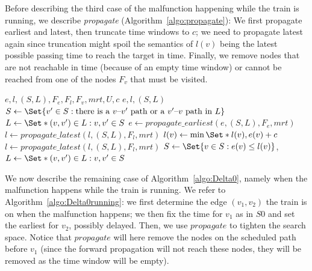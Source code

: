 \documentclass{article}
\begin{document}
Before describing the third case of the malfunction happening while the train is running, we describe \emph{propagate} (Algorithm~\ref{algo:propagate}): We first propagate earliest and latest, then truncate time windows to $c$; we need to propagate latest again since truncation might spoil the semantics of $l(v)$ being the latest possible passing time to reach the target in time. Finally, we remove nodes that are not reachable in time (because of an empty time window) or cannot be reached from one of the nodes $F_v$ that must be visited.

\begin{algorithm}
	\caption{$propagate$} \label{algo:propagate}
	\begin{algorithmic}[1]
	    \Require $e,l,(S,L),F_e,F_l,F_v,mrt,U,c$
	    \Ensure $e,l,(S,L)$
		    \State $S \leftarrow \Set{v^\prime \in S: \textrm{there is a }v\textrm{--}v^\prime\textrm{ path or a }v^\prime\textrm{--}v\textrm{ path in }L}$
		    \State $L \leftarrow \Set*{(v,v^\prime) \in L: v,v^\prime \in S}$
		\EndFor
	    \State $e \leftarrow propagate\_earliest(e, (S,L), F_e, mrt)$
		\State $l \leftarrow propagate\_latest(l,(S,L),F_l, mrt)$
	        \State $l(v) \leftarrow \min \Set*{l(v), e(v)+c}$
	    \EndFor
	    \State $l \leftarrow propagate\_latest(l,(S,L),F_l, mrt)$
	    \EndIf
		\State $S \leftarrow \Set{v \in S: e(v) \leq l(v)}$, $L \leftarrow \Set*{(v,v^\prime) \in L: v,v^\prime \in S}$

	\end{algorithmic}
\end{algorithm}



We now describe the remaining case of Algorithm~\ref{algo:Delta0}, namely when the malfunction happens while the train is running. We refer to Algorithm~\ref{algo:Delta0running}: we first determine the edge $(v_1,v_2)$ the train is on when the malfunction happens; we then fix the time for $v_1$ as in $S0$ and set the earliest for $v_2$, possibly delayed. Then, we use $propagate$ to tighten the search space. Notice that $propagate$ will here remove the nodes on the scheduled path before $v_1$ (since the forward propagation will not reach these nodes, they will be removed as the time window will be empty).
\end{document}
